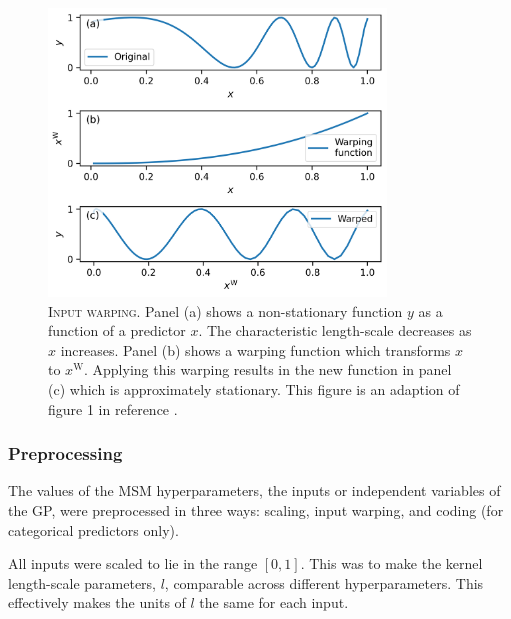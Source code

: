 \begin{figure}
    \centering
    \includegraphics[width=0.8\textwidth]{chapters/msm_optimization/figures/warping_explainer.png}
    \caption[Input warping]{\textsc{Input warping}. Panel (a) shows a non-stationary function $y$ as a function of a predictor $x$. The characteristic length-scale decreases as $x$ increases. Panel (b) shows a warping function which transforms $x$ to $x^\mathrm{W}$. Applying this warping results in the new function in panel (c) which is approximately stationary. This figure is an adaption of figure 1 in reference \cite{snoekInputWarpingBayesian2014a}.}
    \label{fig:msm_warping_explainer}
\end{figure}

\subsubsection{Preprocessing}

The values of the MSM hyperparameters, the inputs or independent variables of the GP,  were preprocessed in three ways: scaling,  input warping, and coding (for categorical predictors only). 

All inputs were scaled to lie in the range $[0, 1]$. This was to make the kernel length-scale parameters, $l$, comparable across different hyperparameters. This effectively makes the units of $l$ the same for each input.


